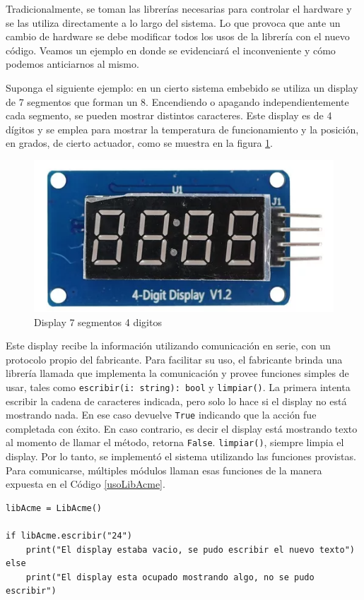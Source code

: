 Tradicionalmente, se toman las librerías necesarias para controlar el hardware y se las utiliza directamente a lo largo del sistema. Lo que provoca que ante un cambio de hardware se debe modificar todos los usos de la librería con el nuevo código. Veamos un ejemplo en donde se evidenciará el inconveniente y cómo podemos anticiarnos al mismo.

Suponga el siguiente ejemplo: en un cierto sistema embebido se utiliza un display de 7 segmentos que forman un 8. Encendiendo o apagando independientemente cada segmento, se pueden mostrar distintos caracteres. Este display es de 4 dígitos y se emplea para mostrar la temperatura de funcionamiento y la posición, en grados, de cierto actuador, como se muestra en la figura \ref{fig:enter-label}.

\begin{figure}[h]
    \centering
    \includegraphics[width=0.5\linewidth]{display.png}
    \caption{Display 7 segmentos 4 digitos}
    \label{fig:enter-label}
\end{figure}


Este display recibe la información utilizando comunicación en serie, con un protocolo propio del fabricante. Para facilitar su uso, el fabricante brinda una librería llamada \LibAcme que implementa la comunicación y provee funciones simples de usar, tales como \verb|escribir(i: string): bool| y \verb|limpiar()|. La primera intenta escribir la cadena de caracteres indicada, pero solo lo hace si el display no está mostrando nada. En ese caso devuelve \verb|True| indicando que la acción fue completada con éxito. En caso contrario, es decir el display está mostrando texto al momento de llamar el método, retorna \verb|False|. \verb|limpiar()|, siempre limpia el display. Por lo tanto, se implementó el sistema utilizando las funciones provistas. Para comunicarse, múltiples módulos llaman esas funciones de la manera expuesta en el Código \ref{usoLibAcme}.

\begin{lstlisting}[label={usoLibAcme}, caption=Ejemplo de uso de la libreria LibAcme.]
libAcme = LibAcme()

if libAcme.escribir("24")
	print("El display estaba vacio, se pudo escribir el nuevo texto")
else
	print("El display esta ocupado mostrando algo, no se pudo escribir")

\end{lstlisting}

